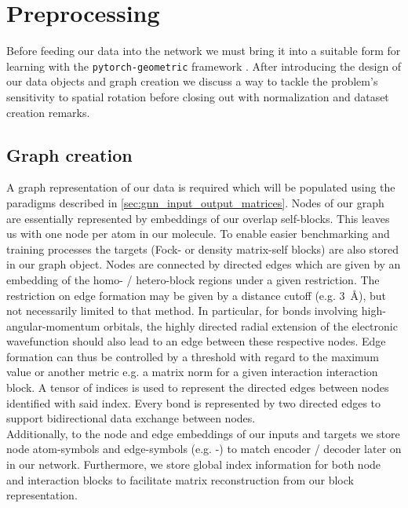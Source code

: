 \section{Preprocessing}
\label{sec:gnn_preproc}
Before feeding our data into the network we must bring it into a suitable form for learning with the \texttt{pytorch-geometric} framework \parencite{ref:PyTorchGeometric, ref:PyTorch_geom_paper}. After introducing the design of our data objects and graph creation we discuss a way to tackle the problem's sensitivity to spatial rotation before closing out with normalization and dataset creation remarks. 
\subsection{Graph creation}
\label{subsec:gnn_graph_creation}
A graph representation of our data is required which will be populated using the paradigms described in \autoref{sec:gnn_input_output_matrices}. Nodes of our graph are essentially represented by embeddings of our overlap self-blocks. This leaves us with one node per atom in our molecule. To enable easier benchmarking and training processes the targets (Fock- or density matrix-self blocks) are also stored in our graph object. Nodes are connected by directed edges which are given by an embedding of the homo- / hetero-block regions under a given restriction. The restriction on edge formation may be given by a distance cutoff (e.g. \SI{3}{\angstrom}), but not necessarily limited to that method. In particular, for bonds involving high-angular-momentum orbitals, the highly directed radial extension of the electronic wavefunction should also lead to an edge between these respective nodes. Edge formation can thus be controlled by a threshold with regard to the maximum value or another metric e.g. a matrix norm for a given interaction interaction block. A tensor of indices is used to represent the directed edges between nodes identified with said index. Every bond is represented by two directed edges to support bidirectional data exchange between nodes.\\

Additionally, to the node and edge embeddings of our inputs and targets we store node atom-symbols and edge-symbols (e.g. -) to match encoder / decoder later on in our network. Furthermore, we store global index information for both node and interaction blocks to facilitate matrix reconstruction from our block representation. 

